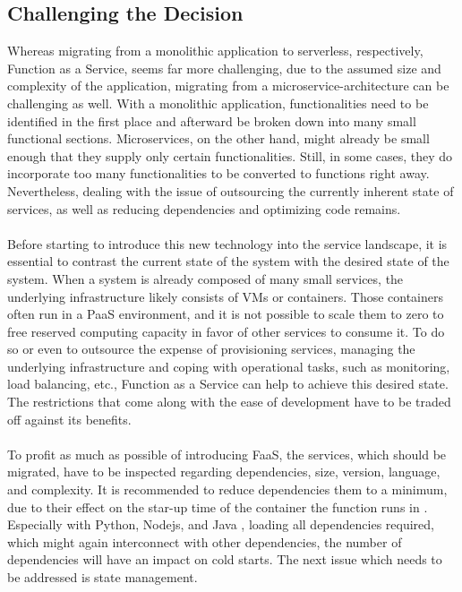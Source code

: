 \documentclass[11pt]{article}
\begin{document}
\subsection{Challenging the Decision}
Whereas migrating from a monolithic application to serverless, respectively, Function as a Service, seems far more challenging, due to the assumed size and complexity of the application, migrating from a microservice-architecture can be challenging as well. With a monolithic application, functionalities need to be identified in the first place and afterward be broken down into many small functional sections. Microservices, on the other hand, might already be small enough that they supply only certain functionalities. Still, in some cases, they do incorporate too many functionalities to be converted to functions right away. Nevertheless, dealing with the issue of outsourcing the currently inherent state of services, as well as reducing dependencies and optimizing code remains. \\\\
Before starting to introduce this new technology into the service landscape, it is essential to contrast the current state of the system with the desired state of the system. When a system is already composed of many small services, the underlying infrastructure likely consists of VMs or containers. Those containers often run in a PaaS environment, and it is not possible to scale them to zero to free reserved computing capacity in favor of other services to consume it. To do so or even to outsource the expense of provisioning services, managing the underlying infrastructure and coping with operational tasks, such as monitoring, load balancing, etc., Function as a Service can help to achieve this desired state. The restrictions that come along with the ease of development have to be traded off against its benefits. \\\\
To profit as much as possible of introducing FaaS, the services, which should be migrated, have to be inspected regarding dependencies, size, version, language, and complexity. It is recommended to reduce dependencies them to a minimum, due to their effect on the star-up time of the container the function runs in \cite{manner2018cold}. Especially with Python, Nodejs, and Java \cite{puripunpinyo2017effect}, loading all dependencies required, which might again interconnect with other dependencies, the number of dependencies will have an impact on cold starts. The next issue which needs to be addressed is state management. \\\\
\end{document}
